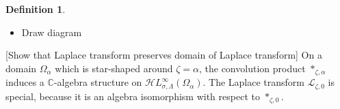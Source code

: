 \documentclass{article}
\let\Re\relax
\DeclareMathOperator{\Re}{Re}
\newcommand{\singexp}[2]{\mathcal{H}L^\infty_{#1, #2}}
\newcommand{\C}{\mathbb{C}}
\newcommand*{\defeq}{\mathrel{\vcenter{\baselineskip0.5ex \lineskiplimit0pt
                     \hbox{\scriptsize.}\hbox{\scriptsize.}}}%
                     =}
\newcommand{\laplace}{\mathcal{L}}
\theoremstyle{definition}
\newtheorem{definition}{Definition}[section]
\theoremstyle{plain}
\newtheorem{prop}[definition]{Proposition}
\newenvironment{todo}{\color{Coral}}{\color{black}}
\newenvironment{brainstorm}{\color{BlueViolet}\begin{itemize}}{\end{itemize}\color{black}}
\newenvironment{old}{\color{RoyalBlue}}{\color{black}}
\newenvironment{draft}{\color{SlateBlue}}{\color{black}}
\begin{document}
\begin{old}
\begin{definition}
\begin{brainstorm}
\begin{equation}
    \phi \ast_{\zeta, \alpha} \psi \defeq \int_{\substack{\mathcal{S}'(\zeta) \times \mathcal{S}''(\zeta) \\ \zeta' + \zeta'' = \zeta}} \phi'\,\psi''\,d\zeta'',
\end{equation}
where $\mathcal{S}'(\zeta)$ is the line segment connecting $\zeta' = \alpha$ to $\zeta' = \zeta$, and $\mathcal{S}''(\zeta)$ is defined similarly \begin{todo}[check]\end{todo}.
\item Draw diagram
\end{brainstorm}
\end{definition}
\begin{todo}[Show that Laplace transform preserves domain of Laplace transform]\end{todo}
\begin{draft}On a domain $\Omega_\alpha$ which is star-shaped around $\zeta = \alpha$, the convolution product $\ast_{\zeta, \alpha}$ induces a $\C$-algebra structure on $\singexp{\sigma}{\Lambda}(\Omega_\alpha)$. The Laplace transform $\laplace_{\zeta, 0}$ is special, because it is an algebra isomorphism with respect to $\ast_{\zeta, 0}$.\end{draft}
\end{old}
\end{document}
